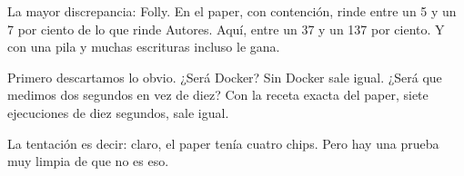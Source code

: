 La mayor discrepancia: Folly. En el paper, con contención, rinde entre un 5 y un 7 por ciento de lo que rinde Autores. Aquí, entre un 37 y un 137 por ciento. Y con una pila y muchas escrituras incluso le gana.

Primero descartamos lo obvio. ¿Será Docker? Sin Docker sale igual. ¿Será que medimos dos segundos en vez de diez? Con la receta exacta del paper, siete ejecuciones de diez segundos, sale igual.

La tentación es decir: claro, el paper tenía cuatro chips. Pero hay una prueba muy limpia de que no es eso.
